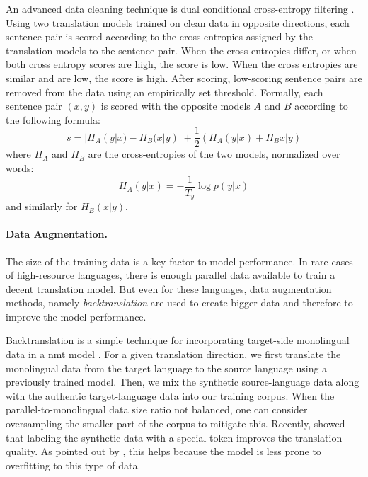 An advanced data cleaning technique is dual conditional cross-entropy filtering
\citep{junczys-dowmunt-2018-dual}. Using two translation models trained on
clean data in opposite directions, each sentence pair is scored according to
the cross entropies assigned by the translation models to the sentence
pair. When the cross entropies differ, or when both cross entropy scores are
high, the score is low. When the cross entropies are similar and are low, the
score is high. After scoring, low-scoring sentence pairs are removed from the
data using an empirically set threshold. Formally, each sentence pair $(x,y)$
is scored with the opposite models $A$ and $B$ according to the following
formula:
%
\begin{equation}
  s = |H_A(y|x) - H_B(x|y)| + \frac{1}{2} (H_A(y|x) + H_B{x|y})
\end{equation}
where $H_A$ and $H_B$ are the cross-entropies of the two models, normalized
over words:
%
\begin{equation}
  H_A(y|x) = - \frac{1}{T_y} \log p(y|x)
\end{equation}
and similarly for $H_B(x|y)$.

\paragraph{Data Augmentation.} The size of the training data is a key factor to
model performance. In rare cases of high-resource languages, there is enough
parallel data available to train a decent translation model. But even for these
languages, data augmentation methods, namely \emph{backtranslation} are used
to create bigger data and therefore to improve the model performance.

Backtranslation is a simple technique for incorporating target-side monolingual
data in a \gls{nmt} model \citep{sennrich-etal-2016-improving}. For a given
translation direction, we first translate the monolingual data from the target
language to the source language using a previously trained model. Then, we mix
the synthetic source-language data along with the authentic target-language
data into our training corpus. When the parallel-to-monolingual data size ratio
not balanced, one can consider oversampling the smaller part of the corpus to
mitigate this. Recently, \citet{caswell-etal-2019-tagged} showed that labeling
the synthetic data with a special token improves the translation quality. As
pointed out by \citet{marie-etal-2020-tagged}, this helps because the model is
less prone to overfitting to this type of data.

